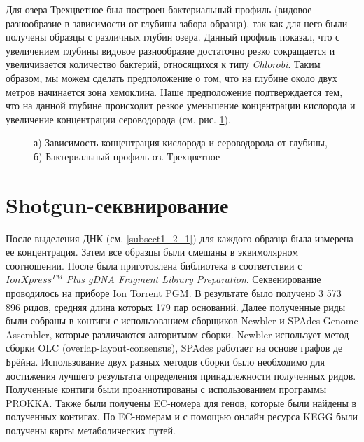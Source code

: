 Для озера Трехцветное был построен бактериальный профиль (видовое разнообразие в зависимости от глубины забора образца), так как для него были получены образцы с различных глубин озера. Данный профиль показал, что с увеличением глубины видовое разнообразие достаточно резко сокращается и увеличивается количество бактерий, относящихся к типу   \textit{Chlorobi}. Таким образом, мы можем сделать предположение о том, что на глубине около двух метров начинается зона хемоклина. Наше предположение подтверждается тем, что на данной глубине происходит резкое уменьшение концентрации кислорода и увеличение концентрации сероводорода (см. рис. \ref{ris:concentr, 3cvet}).  

\begin{figure}[h]
\begin{minipage}[h]{0.5\linewidth}
\end{minipage}
\hfill
\begin{minipage}[h]{0.5\linewidth}
\end{minipage}
\caption{а) Зависимость концентрация кислорода и сероводорода от глубины, б) Бактериальный профиль оз. Трехцветное}
\label{ris:concentr, 3cvet}
\end{figure}

\section{Shotgun-секвнирование}
После выделения ДНК (см. \ref{subsect1_2_1}) для каждого образца была измерена ее концентрация. Затем все образцы были смешаны в эквимолярном соотношении. После была приготовлена библиотека в соответствии с $IonXpress^{TM}$ \textit{Plus gDNA Fragment Library Preparation}. Секвенирование проводилось на приборе Ion Torrent PGM. В результате было получено 3 573 896 ридов, средняя длина которых 179 пар оснований. Далее полученные риды были собраны в контиги с использованием  сборщиков Newbler и SPAdes Genome Assembler, которые различаются алгоритмом сборки. Newbler использует метод сборки OLC (overlap-layout-consensus), SPAdes работает на основе графов де Брёйна. Использование двух разных методов сборки было необходимо для достижения лучшего результата определения принадлежности полученных ридов. Полученные контиги были проаннотированы с использованием программы PROKKA. Также были получены EC-номера для генов, которые были найдены в полученных контигах. По EC-номерам и с помощью онлайн ресурса KEGG были получены карты метаболических путей. 

